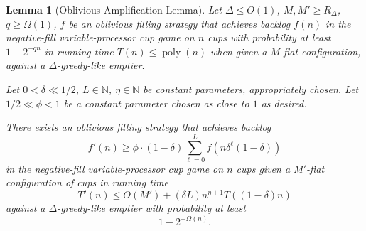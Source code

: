 \documentclass[twocolumn]{article}[10pt]
\DeclareMathOperator{\poly}{\text{poly}}
\newtheorem{lemma}{Lemma}
\begin{document}
\begin{lemma}[Oblivious Amplification Lemma]
  \label{lem:obliviousAmplification} 
  Let $\Delta \le O(1)$, $M, M' \ge R_\Delta$, $q \ge \Omega(1)$, $f$ be an
  oblivious filling strategy that achieves backlog $f(n)$ in the negative-fill
  variable-processor cup game on $n$ cups with probability at least $1-2^{-qn}$
  in running time $T(n) \le \poly(n)$ when given a $M$-flat configuration,
  against a $\Delta$-greedy-like emptier.

  Let $0< \delta \ll 1/2$, $L\in \mathbb{N}$, $\eta \in \mathbb{N}$ be constant
  parameters, appropriately chosen. Let $1/2 \ll \phi<1$ be a constant
  parameter chosen as close to $1$ as desired. 

  There exists an oblivious filling strategy that achieves backlog $$f'(n) \ge
  \phi \cdot (1-\delta)\sum_{\ell=0}^L f(n\delta^\ell(1-\delta))$$ in the
  negative-fill variable-processor cup game on $n$ cups given a $M'$-flat configuration of
  cups in running time $$T'(n) \le O(M') + (\delta L) n^{\eta+1}
  T((1-\delta)n)$$ against a $\Delta$-greedy-like emptier with probability at
  least $$1-2^{-\Omega(n)}.$$
\end{lemma}
\end{document}
